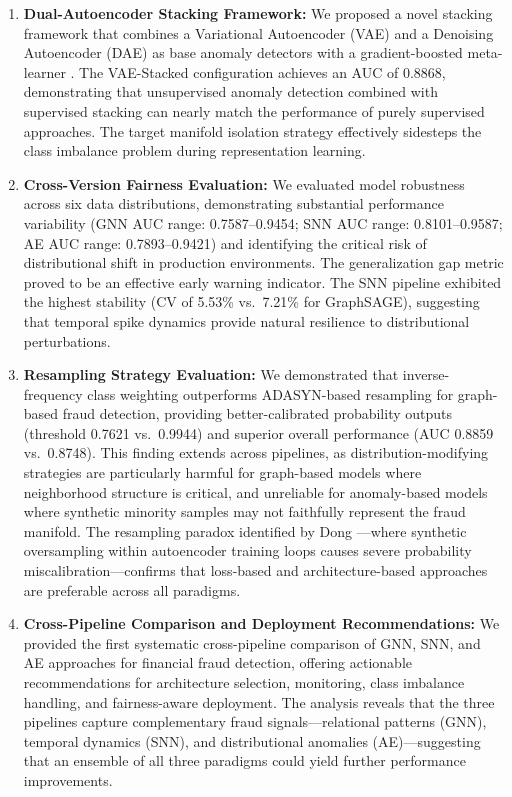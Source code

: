\begin{enumerate}[label=\arabic*.]
\item \textbf{Dual-Autoencoder Stacking Framework:} We proposed a novel stacking framework that combines a Variational Autoencoder (VAE) \cite{kingma2014auto} and a Denoising Autoencoder (DAE) \cite{vincent2010stacked} as base anomaly detectors with a gradient-boosted meta-learner \cite{chen2016xgboost,ke2017lightgbm}. The VAE-Stacked configuration achieves an AUC of 0.8868, demonstrating that unsupervised anomaly detection combined with supervised stacking can nearly match the performance of purely supervised approaches. The target manifold isolation strategy effectively sidesteps the class imbalance problem during representation learning.

\item \textbf{Cross-Version Fairness Evaluation:} We evaluated model robustness across six data distributions, demonstrating substantial performance variability (GNN AUC range: 0.7587--0.9454; SNN AUC range: 0.8101--0.9587; AE AUC range: 0.7893--0.9421) and identifying the critical risk of distributional shift in production environments. The generalization gap metric proved to be an effective early warning indicator. The SNN pipeline exhibited the highest stability (CV of 5.53\% vs.\ 7.21\% for GraphSAGE), suggesting that temporal spike dynamics provide natural resilience to distributional perturbations.

\item \textbf{Resampling Strategy Evaluation:} We demonstrated that inverse-frequency class weighting outperforms ADASYN-based resampling \cite{he2008adasyn,chawla2002smote} for graph-based fraud detection, providing better-calibrated probability outputs (threshold 0.7621 vs.\ 0.9944) and superior overall performance (AUC 0.8859 vs.\ 0.8748). This finding extends across pipelines, as distribution-modifying strategies \cite{farahat2025objective,dong2025enhanced} are particularly harmful for graph-based models where neighborhood structure is critical, and unreliable for anomaly-based models where synthetic minority samples may not faithfully represent the fraud manifold. The resampling paradox identified by Dong \cite{dong2025enhanced}---where synthetic oversampling within autoencoder training loops causes severe probability miscalibration---confirms that loss-based and architecture-based approaches are preferable across all paradigms.

\item \textbf{Cross-Pipeline Comparison and Deployment Recommendations:} We provided the first systematic cross-pipeline comparison of GNN, SNN, and AE approaches for financial fraud detection, offering actionable recommendations for architecture selection, monitoring, class imbalance handling, and fairness-aware deployment. The analysis reveals that the three pipelines capture complementary fraud signals---relational patterns (GNN), temporal dynamics (SNN), and distributional anomalies (AE)---suggesting that an ensemble of all three paradigms could yield further performance improvements.
\end{enumerate}

